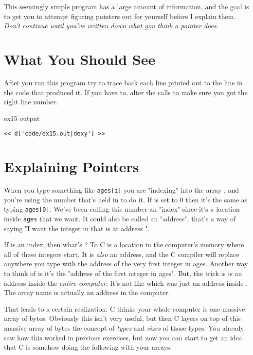 This seemingly simple program has a large amount of information, and the
goal is to get you to attempt figuring pointers out for yourself before
I explain them.  \emph{Don't continue until you've written down what
you think a pointer does.}


\section{What You Should See}

After you run this program try to trace back each line printed out to the
line in the code that produced it.  If you have to, alter the 
calls to make sure you got the right line number.

\begin{code}{ex15 output}
\begin{lstlisting}
<< d['code/ex15.out|dexy'] >>
\end{lstlisting}
\end{code}


\section{Explaining Pointers}

When you type something like \verb|ages[i]| you are "indexing" into the array
, and you're using the number that's held in  to do it.
If  is set to 0 then it's the same as typing \verb|ages[0]|.  We've
been calling this number  an "index" since it's a location inside
\verb|ages| that we want.  It could also be called an "address", that's a way
of saying "I want the integer in  that is at address ".

If  is an index, then what's ?  To C  is a
location in the computer's memory where all of these integers start.  It is
\emph{also} an address, and the C compiler will replace anywhere you type
 with the address of the very first integer in ages.  Another way
to think of  is it's the "address of the first integer in
ages".  But, the trick is  is an address inside the \emph{entire
computer}.  It's not like  which was just an address inside
.  The  array name is actually an address in the
computer.

That leads to a certain realization:  C thinks your whole computer is one
massive array of bytes.  Obviously this isn't very useful, but then C layers on
top of this massive array of bytes the concept of \emph{types} and \emph{sizes}
of those types.  You already saw how this worked in previous exercises, but now
you can start to get an idea that C is somehow doing the following with your
arrays:

